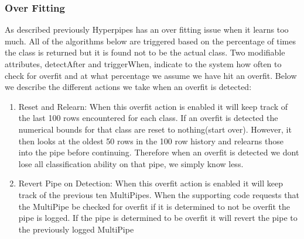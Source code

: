 \subsubsection{Over Fitting}
As described previously Hyperpipes has an over fitting issue 
when it learns too much. All of the algorithms below are triggered 
based on the percentage of times the class is returned but it is 
found not to be the actual class. Two modifiable attributes, detectAfter
and triggerWhen, indicate to the system how often to check for 
overfit and at what percentage we assume we have hit an overfit. 
Below we describe the different actions we take when an overfit
is detected:
\begin{enumerate}
\item Reset and Relearn: 
	When this overfit action is enabled it will keep track of the 
	last 100 rows encountered for each class. If an overfit is detected 
	the numerical bounds for that class are reset to nothing(start over).
	However, it then looks at the oldest 50 rows in the 100 row history 
	and relearns those into the pipe before continuing. Therefore when
	an overfit is detected we dont lose all classification ability on that
	pipe, we simply know less.
\item Revert Pipe on Detection:
	When this overfit action is enabled it will keep track of the previous
	ten MultiPipes. When the supporting code requests that the MultiPipe
	be checked for overfit if it is determined to not be overfit the 
	pipe is logged. If the pipe is determined to be overfit it will revert 
	the pipe to the previously logged MultiPipe
	
\end{enumerate}


